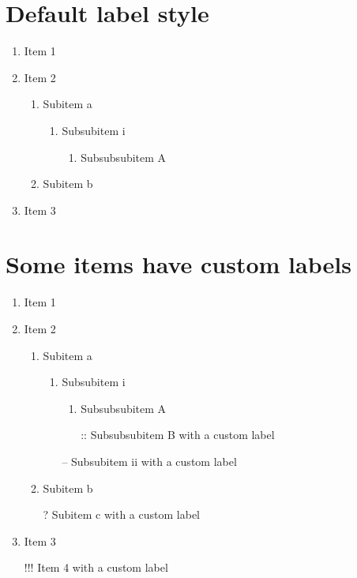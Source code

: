 \documentclass{article}
\begin{document}
\section{Default label style}

\begin{enumerate}
    \item Item 1
    \item Item 2
        \begin{enumerate}
            \item Subitem a
                \begin{enumerate}
                    \item Subsubitem i
                        \begin{enumerate}
                            \item Subsubsubitem A
                        \end{enumerate}
                \end{enumerate}
            \item Subitem b
        \end{enumerate}
    \item Item 3
\end{enumerate}

\section{Some items have custom labels}

\begin{enumerate}
    \item Item 1
    \item Item 2
        \begin{enumerate}
            \item Subitem a
                \begin{enumerate}
                    \item Subsubitem i
                        \begin{enumerate}
                            \item Subsubsubitem A
                            \item[::] Subsubsubitem B with a custom label
                        \end{enumerate}
                    \item[--] Subsubitem ii with a custom label
                \end{enumerate}
            \item Subitem b
            \item[?] Subitem c with a custom label
        \end{enumerate}
    \item Item 3
    \item[!!!] Item 4 with a custom label
\end{enumerate}
\end{document}
